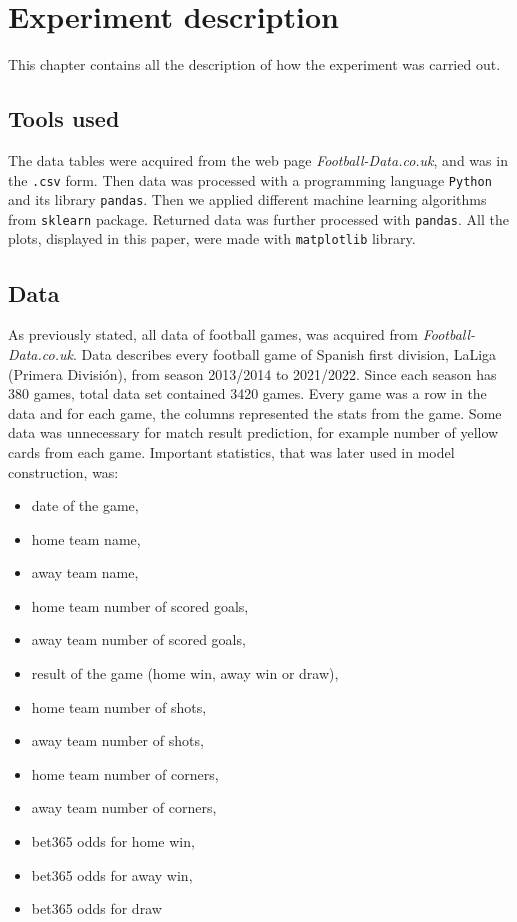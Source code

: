 \documentclass[conference]{IEEEtran}
\begin{document}
\section{Experiment description}

This chapter contains all the description of how the experiment was carried out.

\subsection{Tools used}

The data tables were acquired from the web page \emph{Football-Data.co.uk}, and was in the \texttt{.csv} form.
Then data was processed with a programming language \texttt{Python} and its library \texttt{pandas}. Then we
applied different machine learning algorithms from \texttt{sklearn} package. Returned data was further processed 
with \texttt{pandas}. All the plots, displayed in this paper, were made with \texttt{matplotlib} library.

\subsection{Data}

As previously stated, all data of football games, was acquired from \emph{Football-Data.co.uk}. Data describes every
football game of Spanish first division, LaLiga (Primera División), from season 2013/2014 to 2021/2022. Since each season has 
380 games, total data set contained 3420 games. Every game was a row in the data and for each game, the columns represented 
the stats from the game. Some data was unnecessary for match result prediction, for example number of yellow cards from each game.
Important statistics, that was later used in model construction, was:
\begin{itemize}
    \item date of the game,
    \item home team name,
    \item away team name,
    \item home team number of scored goals,
    \item away team number of scored goals,
    \item result of the game (home win, away win or draw),
    \item home team number of shots,
    \item away team number of shots,
    \item home team number of corners,
    \item away team number of corners,
    \item bet365 odds for home win,
    \item bet365 odds for away win,
    \item bet365 odds for draw
\end{itemize}
\end{document}
